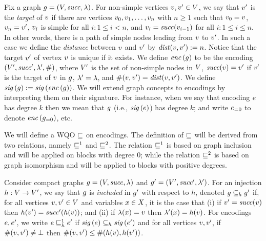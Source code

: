 Fix a graph $g=\left(V,{\it succ},\lambda\right)$.
%
For non-simple vertices $v,v'\in V$, we say that
$v'$ is the {\it target} of $v$ if there are
vertices $v_0,v_1,\ldots,v_{n}$ with $n\geq 1$ such that
$v_0=v$, $v_{n}=v'$, $v_i$ is simple for all $i:1\leq i< n$, and
$v_i={\it succ}(v_{i-1})$ for all $i:1\leq i\leq n$.
%
In other words, there is a path of simple nodes leading from $v$ to $v'$.
%
In such a case we define the {\it distance} between $v$ and $v'$ by
${\it dist}(v,v'):=n$.
%
Notice that the target $v'$ of vertex $v$ is unique if it exists.
%
We define ${\it enc}\left(g\right)$ to be the encoding
$\left(V',{\it succ}',\lambda',\#\right)$, where
$V'$ is the set of non-simple nodes in $V$,
${\it succ}(v)=v'$ if $v'$ is the target of $v$ in $g$,
$\lambda'=\lambda$, and
$\#(v,v')={\it dist}(v,v')$.
%
We define ${\it sig}\left(g\right):={\it sig}\left({\it enc}\left(g\right)\right)$.
%
We will extend graph concepts to encodings by 
interpreting them on their signature.
%
For instance, when we say that encoding $e$ has degree $k$ then
we mean that $g$ (i.e., ${\it sig}\left(e\right)$) has degree $k$;
and write ${e}_{=0}$ to denote ${\it enc}\left({g}_{=0}\right)$, etc.


%
We will define a WQO $\sqsubseteq$ on encodings.
%
The definition of $\sqsubseteq$ will be derived from two relations, namely
$\sqsubseteq^1$ and $\sqsubseteq^2$.
%
The relation  $\sqsubseteq^1$ is
based on graph inclusion and will be applied on blocks with degree $0$;
while the relation  $\sqsubseteq^2$ is
based on graph isomorphism and will be applied to blocks with positive degrees.

Consider compact graphs $g=\left(V,{\it succ},\lambda\right)$ and 
$g'=\left(V',{\it succ}',\lambda'\right)$.
%
For an injection $h:V\rightarrow V'$, 
we say that $g$ is {\it included} in $g'$
with respect to $h$, denoted $g\subseteq_hg'$
if, for all vertices $v,v'\in V$ and variables $x\in X$,
it is the case that
(i) if $v'={\it succ}(v)$ then $h(v')={\it succ}'(h(v))$; and
(ii) if $\lambda(x)=v$ then $\lambda'(x)=h(v)$.
%
%
For encodings $e,e'$, we write $e\sqsubseteq^1_he'$ if 
${\it sig}\left(e\right)\subseteq_h{\it sig}\left(e'\right)$ and for all vertices $v,v'$,
if $\#(v,v')\neq\bot$ then  $\#(v,v')\leq\#(h(v),h(v'))$.
%
%


